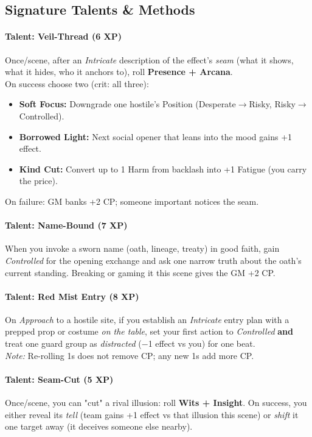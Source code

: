 \subsection{Signature Talents \& Methods}
\paragraph{Talent: Veil-Thread (6 XP)}
Once/scene, after an \emph{Intricate} description of the effect's \emph{seam} (what it shows, what it hides, who it anchors to), roll \textbf{Presence + Arcana}. \\
On success choose two (crit: all three):
\begin{itemize}
  \item \textbf{Soft Focus:} Downgrade one hostile's Position (Desperate$\to$Risky, Risky$\to$Controlled).
  \item \textbf{Borrowed Light:} Next social opener that leans into the mood gains +1 effect.
  \item \textbf{Kind Cut:} Convert up to 1 Harm from backlash into +1 Fatigue (you carry the price).
\end{itemize}
On failure: GM banks +2 CP; someone important notices the seam.

\paragraph{Talent: Name-Bound (7 XP)}
When you invoke a sworn name (oath, lineage, treaty) in good faith, gain \emph{Controlled} for the opening exchange and ask one narrow truth about the oath's current standing. Breaking or gaming it this scene gives the GM +2 CP.

\paragraph{Talent: Red Mist Entry (8 XP)}
On \emph{Approach} to a hostile site, if you establish an \emph{Intricate} entry plan with a prepped prop or costume \emph{on the table}, set your first action to \emph{Controlled} \textbf{and} treat one guard group as \emph{distracted} (−1 effect vs you) for one beat. \\
\emph{Note:} Re-rolling 1s does not remove CP; any new 1s add more CP.

\paragraph{Talent: Seam-Cut (5 XP)}
Once/scene, you can "cut" a rival illusion: roll \textbf{Wits + Insight}. On success, you either reveal its \emph{tell} (team gains +1 effect vs that illusion this scene) or \emph{shift} it one target away (it deceives someone else nearby).

